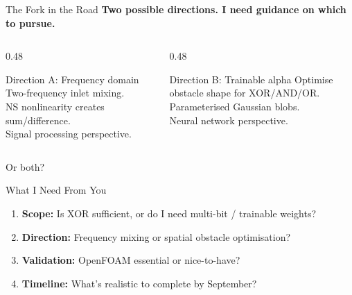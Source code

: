 \documentclass[aspectratio=169,11pt]{beamer}
\begin{document}
\begin{frame}{The Fork in the Road}
  \textbf{Two possible directions. I need guidance on which to pursue.}

  \vspace{0.5cm}
  \begin{columns}[T]
    \begin{column}{0.48\textwidth}
      \begin{block}{\footnotesize Direction A: Frequency domain}
        \footnotesize
        Two-frequency inlet mixing.\\
        NS nonlinearity creates sum/difference.\\
        Signal processing perspective.
      \end{block}
    \end{column}
    \begin{column}{0.48\textwidth}
      \begin{block}{\footnotesize Direction B: Trainable alpha}
        \footnotesize
        Optimise obstacle shape for XOR/AND/OR.\\
        Parameterised Gaussian blobs.\\
        Neural network perspective.
      \end{block}
    \end{column}
  \end{columns}

  \vspace{0.5cm}
  \begin{center}
    \textcolor{gdpBurgundy}{\large Or both?}
  \end{center}
\end{frame}

\begin{frame}{What I Need From You}
  \begin{enumerate}
    \item \textbf{Scope:} Is XOR sufficient, or do I need multi-bit / trainable weights?
    \item \textbf{Direction:} Frequency mixing or spatial obstacle optimisation?
    \item \textbf{Validation:} OpenFOAM essential or nice-to-have?
    \item \textbf{Timeline:} What's realistic to complete by September?
  \end{enumerate}
\end{frame}
\end{document}
